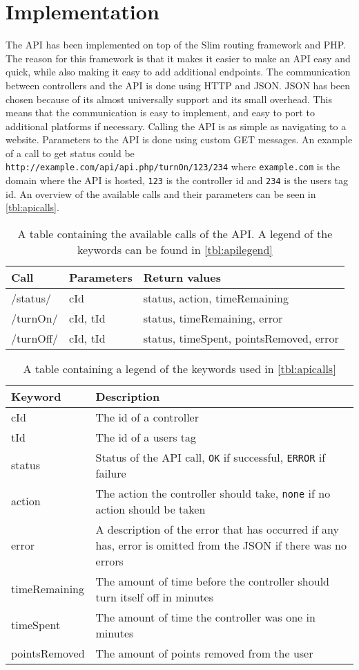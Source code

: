 \section{Implementation}
The API has been implemented on top of the Slim routing framework and PHP. The reason for this framework is that it makes it easier to make an API easy and quick, while also making it easy to add additional endpoints. The communication between controllers and the API is done using HTTP and JSON. JSON has been chosen because of its almost universally support and its small overhead. This means that the communication is easy to implement, and easy to port to additional platforms if necessary. Calling the API is as simple as navigating to a website. Parameters to the API is done using custom GET messages. An example of a call to get status could be \texttt{http://example.com/api/api.php/turnOn/123/234} where \texttt{example.com} is the domain where the API is hosted, \texttt{123} is the controller id and \texttt{234} is the users tag id. An overview of the available calls and their parameters can be seen in \autoref{tbl:apicalls}.

\begin{table}[!h]
\begin{tabular}{| l | l | l |}
\hline
Call & Parameters & Return values \\
\hline
/status/ & cId & status, action, timeRemaining \\
\hline
/turnOn/ & cId, tId & status, timeRemaining, error \\
\hline
/turnOff/ & cId, tId & status, timeSpent, pointsRemoved, error \\
\hline
\end{tabular}
\caption{A table containing the available calls of the API. A legend of the keywords can be found in \autoref{tbl:apilegend}}
\label{tbl:apicalls}
\end{table}

\begin{table}[!h]
\begin{tabular}{| l | p{9cm} |}
\hline
Keyword & Description \\
\hline
cId & The id of a controller \\
\hline
tId & The id of a users tag \\
\hline
status & Status of the API call, \texttt{OK} if successful, \texttt{ERROR} if failure \\
\hline
action & The action the controller should take, \texttt{none} if no action should be taken \\
\hline
error & A description of the error that has occurred if any has, error is omitted from the JSON if there was no errors \\
\hline
timeRemaining & The amount of time before the controller should turn itself off in minutes \\
\hline
timeSpent & The amount of time the controller was one in minutes \\
\hline
pointsRemoved & The amount of points removed from the user \\
\hline
\end{tabular}
\caption{A table containing a legend of the keywords used in \autoref{tbl:apicalls}}
\label{tbl:apilegend}
\end{table}